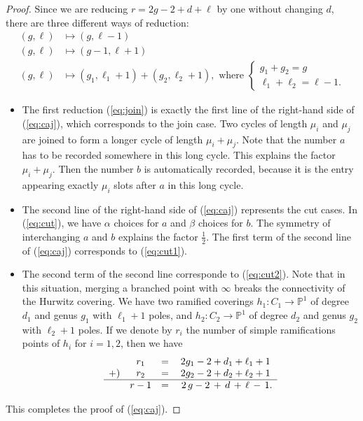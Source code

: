 \documentclass{amsart}
\theoremstyle{definition}
\numberwithin{equation}{section}
\numberwithin{figure}{section}
\def\a{\alpha}
\def\b{\beta}
\newcommand{\bP}{{\mathbb{P}}}
\newcommand{\half}{{\frac{1}{2}}}
\newcommand{\rar}{\rightarrow}
\begin{document}
\begin{proof} Since we are reducing $r=2g-2+d+\ell$ by one
without changing $d$, there are
three different ways of reduction:
\begin{align}
\label{eq:join}
(g,\ell)&\longmapsto (g,\ell-1)
\\
\label{eq:cut1}
(g,\ell)&\longmapsto (g-1,\ell+1)
\\
\label{eq:cut2}
(g,\ell)&\longmapsto (g_1,\ell_1+1)+(g_2,\ell_2+1),
\text{ where }
\begin{cases}
g_1+g_2=g
\\
\ell_1+\ell_2 = \ell -1.
\end{cases}
\end{align}

\begin{itemize}
\item
The first reduction (\ref{eq:join}) is exactly the
first line of the right-hand side
of (\ref{eq:caj}), which corresponds to
the join case. Two cycles of length 
$\mu_i$ and $\mu_j$ are joined to form
a longer cycle of length $\mu_i+\mu_j$. 
Note that the number $a$ has to be recorded somewhere
in this long cycle. This explains the factor
$\mu_i+\mu_j$. Then the number $b$ is automatically
recorded,
because it is  the entry appearing exactly $\mu_i$
slots after $a$ in this 
long cycle.

\item
The second line of the right-hand side 
of (\ref{eq:caj}) represents
the cut cases. In (\ref{eq:cut}), we have
$\a$ choices for $a$ and $\b$ choices for $b$. 
The symmetry of interchanging $a$ and $b$ 
explains the factor $\half$.
The first term of the second line of 
(\ref{eq:caj}) corresponds to (\ref{eq:cut1}).

\item
The second term of the second line
corresponde to (\ref{eq:cut2}).
Note that in this situation, merging a branched point
with $\infty$ breaks the connectivity of 
the Hurwitz covering. We have two ramified 
coverings $h_1:C_1\rar \bP^1$ of 
degree $d_1$ and genus $g_1$
with $\ell_1+1$ poles, and 
$h_2:C_2\rar \bP^1$ of degree $d_2$
and genus $g_2$ with
$\ell_2+1$ poles. If we denote by $r_i$ the
number of simple ramifications points of 
$h_i$ for $i=1,2$, then we have
$$
\begin{matrix}
&r_1 &= &2g_1-2+d_1+\ell_1+1\\
+)&r_2&= &2g_2-2+d_2+\ell_2+1\\
\hline
&r-1 &= &\;2\,g-2\,+\,d\,+\,\ell\,-\,1.
\end{matrix}
$$
\end{itemize}
This completes the proof of (\ref{eq:caj}).
\end{proof}
\end{document}
